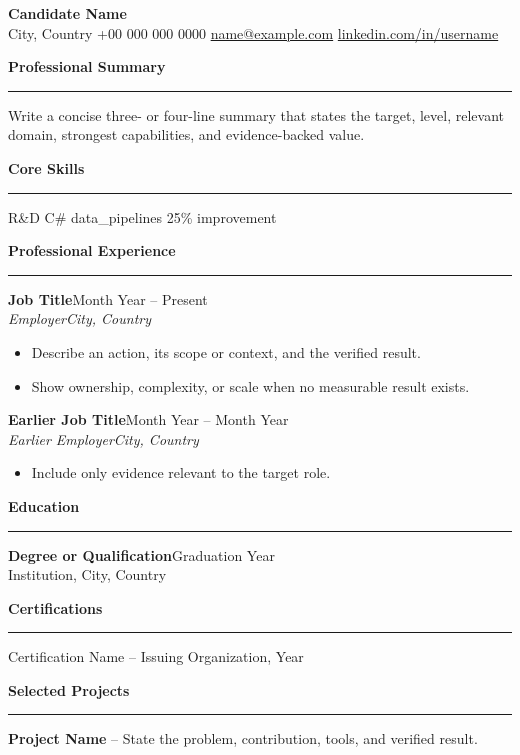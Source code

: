 \documentclass[10pt,a4paper]{article}
\newcommand{\resumeSection}[1]{%
  \vspace{8pt}%
  {\large\bfseries #1}\par
  \vspace{2pt}\hrule\vspace{4pt}%
}
\newcommand{\resumeRole}[4]{%
  \textbf{#1}\hfill #2\\
  \textit{#3}\hfill \textit{#4}\par
}
\begin{document}
{\LARGE\bfseries Candidate Name}\\
City, Country \textbar{} +00 000 000 0000 \textbar{}
\href{mailto:name@example.com}{name@example.com} \textbar{}
\href{https://www.linkedin.com/in/username}{linkedin.com/in/username}

\resumeSection{Professional Summary}
Write a concise three- or four-line summary that states the target, level,
relevant domain, strongest capabilities, and evidence-backed value.

\resumeSection{Core Skills}
R\&D \textbar{} C\# \textbar{} data\_pipelines \textbar{} 25\% improvement

\resumeSection{Professional Experience}
\resumeRole{Job Title}{Month Year -- Present}{Employer}{City, Country}
\begin{itemize}
  \item Describe an action, its scope or context, and the verified result.
  \item Show ownership, complexity, or scale when no measurable result exists.
\end{itemize}

\resumeRole{Earlier Job Title}{Month Year -- Month Year}{Earlier Employer}{City, Country}
\begin{itemize}
  \item Include only evidence relevant to the target role.
\end{itemize}

\resumeSection{Education}
\textbf{Degree or Qualification}\hfill Graduation Year\\
Institution, City, Country

\resumeSection{Certifications}
Certification Name -- Issuing Organization, Year

\resumeSection{Selected Projects}
\textbf{Project Name} -- State the problem, contribution, tools, and verified result.
\end{document}

